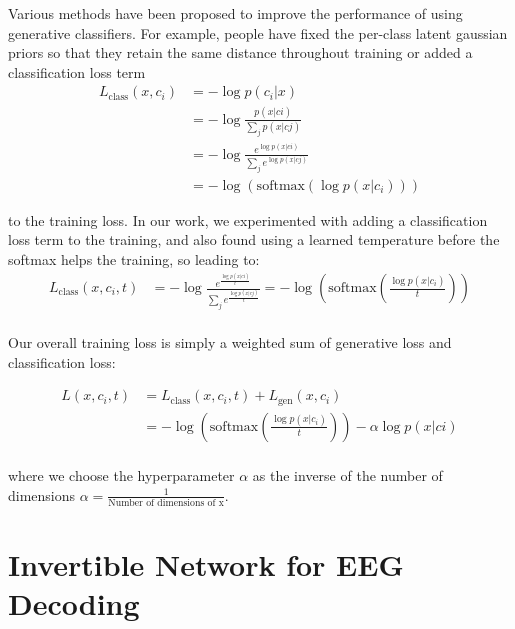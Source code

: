 Various methods have been proposed to improve the performance of using
generative classifiers. For example, people have fixed the per-class
latent gaussian priors so that they retain the same distance throughout
training \citep{DBLP:conf/icml/IzmailovKFW20} or added a
classification loss term
\begin{align*}
L_\textrm{class}(x,c_i)&=-\log p(c_i|x)\\
&= -\log \frac{p(x|ci)}{\sum_j p(x|cj)}\\
&=-\log \frac{e^{\log p(x|ci)}}{\sum_j e^{\log p(x|cj)}}\\
&=-\log \left( \mathrm{softmax}\left({\log p(x|c_i)}\right) \right)
\end{align*}

to the training loss\citep{DBLP:conf/nips/ArdizzoneMRK20}. In
our work, we experimented with adding a classification loss term to the
training, and also found using a learned temperature before the softmax
helps the training, so leading to:
\begin{equation}
\begin{split}
   L_\textrm{class}(x,c_i,t)&= -\log \frac{e^{\frac{\log p(x|ci)}{t}}}{\sum_j e^{\frac{\log p(x|cj)}{t}}}=-\log \left( \mathrm{softmax}\left({\frac{\log p(x|c_i)}{t}}\right) \right) \\
\end{split}
\end{equation}

Our overall training loss is simply a weighted sum of generative loss
and classification loss:

\begin{equation}
\begin{split}
   L(x,c_i,t)&= L_\textrm{class}(x,c_i,t) + L_\textrm{gen}(x,c_i)\\
   &= -\log \left( \mathrm{softmax}\left({\frac{\log p(x|c_i)}{t}}\right) \right) - \alpha \log p(x|ci)\\
\end{split}
\end{equation}


where we choose the hyperparameter $\alpha$ as the inverse of the
number of dimensions $\alpha=\frac{1}{\textrm{Number of dimensions of x}}$.

\section{Invertible Network for EEG
Decoding}\label{invertible-network-for-eeg-decoding}


